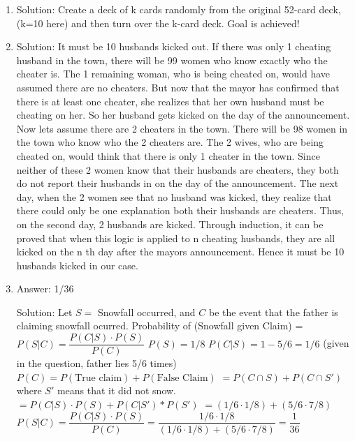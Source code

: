 \begin{enumerate}

\item
Solution: Create a deck of k cards randomly from the original 52-card deck, (k=10 here) and then turn over the k-card deck. Goal is achieved!




\item
Solution: It must be 10 husbands kicked out.
If there was only 1 cheating husband in the town, there will be 99 women who know exactly who the cheater is. The 1 remaining woman, who is being cheated on, would have assumed there are no cheaters. But now that the mayor has confirmed that there is at least one cheater, she realizes that her own husband must be cheating on her. So her husband gets kicked on the day of the announcement.
Now lets assume there are 2 cheaters in the town. There will be 98 women in the town who know who the 2 cheaters are. The 2 wives, who are being cheated on, would think that there is only 1 cheater in the town.  Since neither of these 2 women know that their husbands are cheaters, they both do not report their husbands in on the day of the announcement. The next day, when the 2 women see that no husband was kicked, they realize that there could only be one explanation  both their husbands are cheaters. Thus, on the second day, 2 husbands are kicked.
Through induction, it can be proved that when this logic is applied to n cheating husbands, they are all kicked on the n th day after the mayors announcement. Hence it must be 10 husbands kicked in our case.




\item
Answer: 1/36
 
Solution: Let $S =$ Snowfall occurred, and $C$ be the event that the father is claiming snowfall ocurred.
Probability of (Snowfall given Claim) = $P(S | C) = \dfrac{P(C|S) \cdot P(S)}{P(C)}$
$P(S) = 1/8$
$P(C|S) =1 - 5/6 = 1/6$ (given in the question, father lies 5/6 times)
$P(C) = P(\text{True claim}) + P(\text{False Claim})$
$= P(C \cap S) + P(C \cap S')$  where $S'$ means that it did not snow.
$= P(C|S) \cdot P(S) + P( C | S') * P(S')$
$= (1/6 \cdot 1/8) + (5/6 \cdot 7/8)$
$P(S | C) = \dfrac{P(C|S) \cdot P(S)}{P(C)} = \dfrac{1/6 \cdot 1/8}{(1/6 \cdot 1/8) + (5/6 \cdot 7/8)} = \dfrac{1}{36}$




\end{enumerate}
